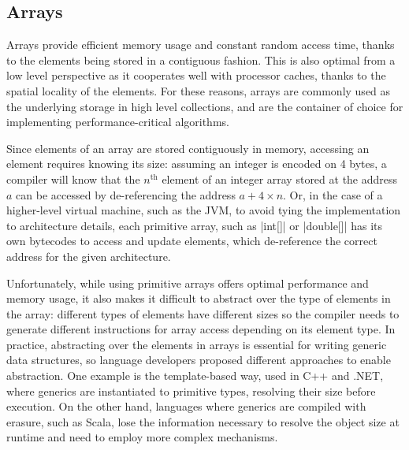 \subsection{Arrays}
\label{sec:mbarrays}

Arrays provide efficient memory usage and constant random access time, thanks to the elements being stored in a contiguous fashion. This is also optimal from a low level perspective as it cooperates well with processor caches, thanks to the spatial locality of the elements. For these reasons, arrays are commonly used as the underlying storage in high level collections, and are the container of choice for implementing performance-critical algorithms.

Since elements of an array are stored contiguously in memory, accessing an element requires knowing its size: assuming an integer is encoded on 4 bytes, a compiler will know that the $n^\text{th}$ element of an integer array stored at the address $a$ can be accessed by de-referencing the address $a + 4 \times n$. Or, in the case of a higher-level virtual machine, such as the JVM, to avoid tying the implementation to architecture details, each primitive array, such as |int[]| or |double[]| has its own bytecodes to access and update elements, which de-reference the correct address for the given architecture.


Unfortunately, while using primitive arrays offers optimal performance and memory usage, it also makes it difficult to abstract over the type of elements in the array: different types of elements have different sizes so the compiler needs to generate different instructions for array access depending on its element type. In practice, abstracting over the elements in arrays is essential for writing generic data structures, so language developers proposed different approaches to enable abstraction. One example is the template-based way, used in C++ and .NET, where generics are instantiated to primitive types, resolving their size before execution. On the other hand, languages where generics are compiled with erasure, such as Scala, lose the information necessary to resolve the object size at runtime and need to employ more complex mechanisms.

